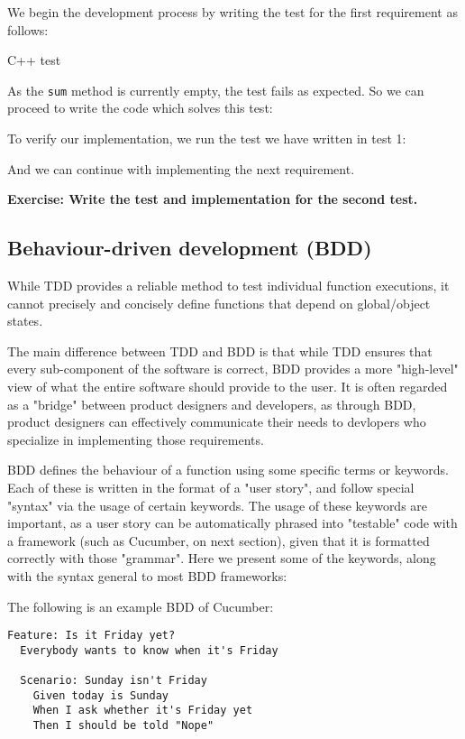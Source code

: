 We begin the development process by writing the test for the first requirement as follows:

\rem C++ test

As the \texttt{sum} method is currently empty, the test fails as expected. So we can proceed to write the code which solves this test:


To verify our implementation, we run the test we have written in test 1:


And we can continue with implementing the next requirement. 

\textbf{Exercise: Write the test and implementation for the second test.}

\subsection{Behaviour-driven development (BDD)}

While TDD provides a reliable method to test individual function executions, it cannot precisely and concisely define functions that depend on global/object states.

The main difference between TDD and BDD is that while TDD ensures that every sub-component of the software is correct, BDD provides a more "high-level" view of what the entire software should provide to the user. It is often regarded as a "bridge" between product designers and developers, as through BDD, product designers can effectively communicate their needs to devlopers who specialize in implementing those requirements. 

BDD defines the behaviour of a function using some specific terms or keywords. Each of these is written in the format of a "user story", and follow special "syntax" via the usage of certain keywords. The usage of these keywords are important, as a user story can be automatically phrased into "testable" code with a framework (such as Cucumber, on next section), given that it is formatted correctly with those "grammar". Here we present some of the keywords, along with the syntax general to most BDD frameworks:

The following is an example BDD of Cucumber:

\begin{lstlisting}
Feature: Is it Friday yet?
  Everybody wants to know when it's Friday

  Scenario: Sunday isn't Friday
    Given today is Sunday
    When I ask whether it's Friday yet
    Then I should be told "Nope"
\end{lstlisting}

